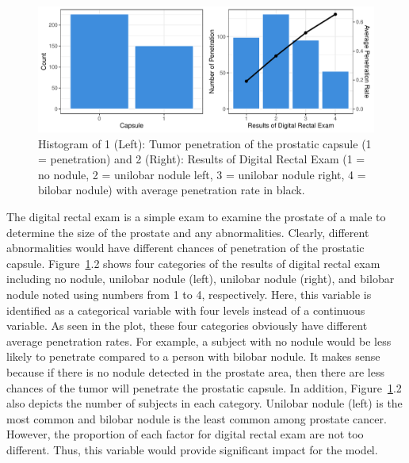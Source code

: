 \documentclass[11pt]{article}\usepackage[]{graphicx}\usepackage[]{color}
\makeatletter
\def\maxwidth{ %
  \ifdim\Gin@nat@width>\linewidth
    \linewidth
  \else
    \Gin@nat@width
  \fi
}
\makeatother
\begin{document}
\begin{figure}[h!] 
\begin{center}

\includegraphics[width=\maxwidth]{figure/unnamed-chunk-1-1} 

\caption{Histogram of 1 (Left): Tumor penetration of the prostatic capsule (1 = penetration) and 2 (Right): Results of Digital Rectal Exam (1 = no nodule, 2 = unilobar nodule left, 3 = unilobar nodule right, 4 = bilobar nodule) with average penetration rate in black.}
\label{explore1}
\end{center} 
\end{figure}

\noindent The digital rectal exam is a simple exam to examine the prostate of a male to determine the size of the prostate and any abnormalities. Clearly, different abnormalities would have different chances of penetration of the prostatic capsule. Figure~\ref{explore1}.2 shows four categories of the results of digital rectal exam including no nodule, unilobar nodule (left), unilobar nodule (right), and bilobar nodule noted using numbers from 1 to 4, respectively. Here, this variable is identified as a categorical variable with four levels instead of a continuous variable. As seen in the plot, these four categories obviously have different average penetration rates. For example, a subject with no nodule would be less likely to penetrate compared to a person with bilobar nodule. It makes sense because if there is no nodule detected in the prostate area, then there are less chances of the tumor will penetrate the prostatic capsule. In addition, Figure~\ref{explore1}.2 also depicts the number of subjects in each category. Unilobar nodule (left) is the most common and bilobar nodule is the least common among prostate cancer. However, the proportion of each factor for digital rectal exam are not too different. Thus, this variable would provide significant impact for the model.   
\hfill \break
\end{document}
